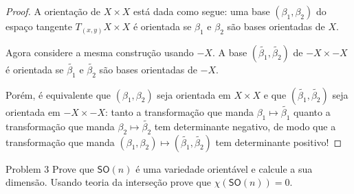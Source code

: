 \begin{proof}\leavevmode
	A orientação de \(X \times X\) está dada como segue: uma base \((\beta_1,\beta_2)\) do espaço tangente \(T_{(x,y)} X \times X\) é orientada se \(\beta_1\) e \(\beta_2\) são bases orientadas de \(X\).

Agora considere a mesma construção usando \(-X\). A base \((\tilde{\beta_1},\tilde{\beta_2})\) de \(-X \times -X\) é orientada se \(\tilde{\beta_1}\) e \(\tilde{\beta_2}\) são bases orientadas de \(-X\).

Porém, é equivalente que \((\beta_1,\beta_2)\) seja orientada em \(X\times X\) e que \((\tilde{\beta_1},\tilde{\beta_2})\) seja orientada em \(-X \times -X\): tanto a transformação que manda \(\beta_1 \mapsto \tilde{\beta_1}\) quanto a transformação que manda \(\beta_2 \mapsto \tilde{\beta_2}\) tem determinante negativo, de modo que a transformação que manda \((\beta_1,\beta_2)\mapsto (\tilde{\beta_1},\tilde{\beta_2})\) tem determinante positivo!
\end{proof}

\begin{thing1}{Problem 3}\label{prob:3}\leavevmode
Prove que \(\mathsf{SO}(n)\) é uma variedade orientável e calcule a sua dimensão. Usando teoria da interseção prove que \(\chi(\mathsf{SO}(n))=0\).
\end{thing1}


